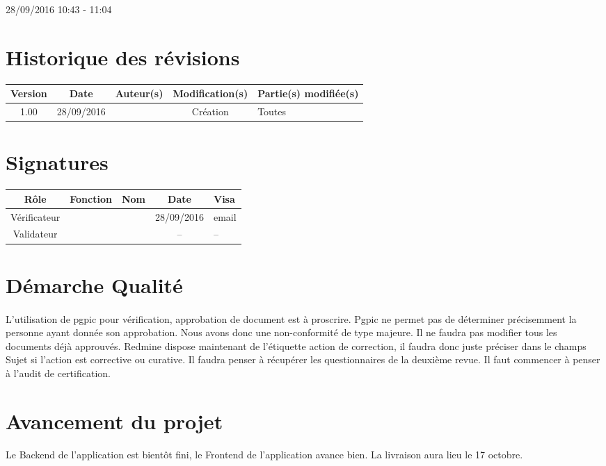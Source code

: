 \documentclass [a4paper] {article}
\begin{document}
\rhead{}

28/09/2016
\hfill   
\hfill 	10:43 - 11:04 				%



\section*{Historique des révisions}
\begin{center}
			\begin{tabular}{| c | c | c | c | p{4cm} |}
				\hline
				\rowcolor{Gray}
				Version & Date & Auteur(s) & Modification(s) & Partie(s) modifiée(s)		 \\
				\hline
				1.00 & 28/09/2016 & \Kafui & Création & Toutes \\
		\hline		
			\end{tabular}
		\end{center}

\section*{Signatures}

		\begin{center}
			\begin{tabular}{| c | c | c | c | p{4cm} |}
				\hline
				\rowcolor{Gray}
				Rôle & Fonction & Nom & Date & Visa		 \\
				\hline
				Vérificateur & \RGC & \Melissa & 28/09/2016 & email \\[30pt]
				\hline
				Validateur & \CP & \Pierre & -- & -- \\[30pt]	
				\hline
			\end{tabular}
		\end{center}


\section{Démarche Qualité}
\paragraph*{}
L'utilisation de pgpic pour vérification, approbation de document est à proscrire. Pgpic ne permet pas de déterminer précisemment la personne ayant donnée son approbation. Nous avons donc une non-conformité de type majeure. Il ne faudra pas modifier tous les documents déjà approuvés.
Redmine dispose maintenant de l'étiquette action de correction, il faudra donc juste préciser dans le champs Sujet si l'action est corrective ou curative.
Il faudra penser à récupérer les questionnaires de la deuxième revue.
Il faut commencer à penser à l'audit de certification.

\section{Avancement du projet}
\paragraph*{}
Le Backend de l'application est bientôt fini, le Frontend de l'application avance bien. La livraison aura lieu le 17 octobre. 
\end{document}
